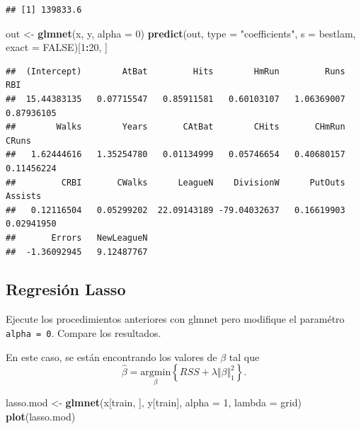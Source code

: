 \documentclass[
  12pt,
]{book}
\newenvironment{Shaded}{\begin{snugshade}}{\end{snugshade}}
\newcommand{\DataTypeTok}[1]{\textcolor[rgb]{0.13,0.29,0.53}{#1}}
\newcommand{\DecValTok}[1]{\textcolor[rgb]{0.00,0.00,0.81}{#1}}
\newcommand{\KeywordTok}[1]{\textcolor[rgb]{0.13,0.29,0.53}{\textbf{#1}}}
\newcommand{\NormalTok}[1]{#1}
\newcommand{\OperatorTok}[1]{\textcolor[rgb]{0.81,0.36,0.00}{\textbf{#1}}}
\newcommand{\OtherTok}[1]{\textcolor[rgb]{0.56,0.35,0.01}{#1}}
\newcommand{\StringTok}[1]{\textcolor[rgb]{0.31,0.60,0.02}{#1}}
\theoremstyle{definition}
\theoremstyle{definition}
\theoremstyle{definition}
\theoremstyle{remark}
\begin{document}
\begin{verbatim}
## [1] 139833.6
\end{verbatim}

\begin{Shaded}
\begin{Highlighting}[]
\NormalTok{out <-}\StringTok{ }\KeywordTok{glmnet}\NormalTok{(x, y, }\DataTypeTok{alpha =} \DecValTok{0}\NormalTok{)}
\KeywordTok{predict}\NormalTok{(out, }\DataTypeTok{type =} \StringTok{"coefficients"}\NormalTok{, }\DataTypeTok{s =}\NormalTok{ bestlam, }\DataTypeTok{exact =} \OtherTok{FALSE}\NormalTok{)[}\DecValTok{1}\OperatorTok{:}\DecValTok{20}\NormalTok{, }
\NormalTok{    ]}
\end{Highlighting}
\end{Shaded}

\begin{verbatim}
##  (Intercept)        AtBat         Hits        HmRun         Runs          RBI 
##  15.44383135   0.07715547   0.85911581   0.60103107   1.06369007   0.87936105 
##        Walks        Years       CAtBat        CHits       CHmRun        CRuns 
##   1.62444616   1.35254780   0.01134999   0.05746654   0.40680157   0.11456224 
##         CRBI       CWalks      LeagueN    DivisionW      PutOuts      Assists 
##   0.12116504   0.05299202  22.09143189 -79.04032637   0.16619903   0.02941950 
##       Errors   NewLeagueN 
##  -1.36092945   9.12487767
\end{verbatim}

\hypertarget{regresiuxf3n-lasso-1}{%
\subsection{Regresión Lasso}\label{regresiuxf3n-lasso-1}}

Ejecute los procedimientos anteriores con glmnet pero modifique el paramétro \texttt{alpha\ =\ 0}. Compare los resultados.

En este caso, se están encontrando los valores de \(\beta\) tal que
\[\hat{\beta} = \underset{\beta}{\mathrm{argmin}} \left\{RSS + \lambda \Vert \beta \Vert_1^2\right\}.\]

\begin{Shaded}
\begin{Highlighting}[]
\NormalTok{lasso.mod <-}\StringTok{ }\KeywordTok{glmnet}\NormalTok{(x[train, ], y[train], }\DataTypeTok{alpha =} \DecValTok{1}\NormalTok{, }
    \DataTypeTok{lambda =}\NormalTok{ grid)}
\KeywordTok{plot}\NormalTok{(lasso.mod)}
\end{Highlighting}
\end{Shaded}
\end{document}
